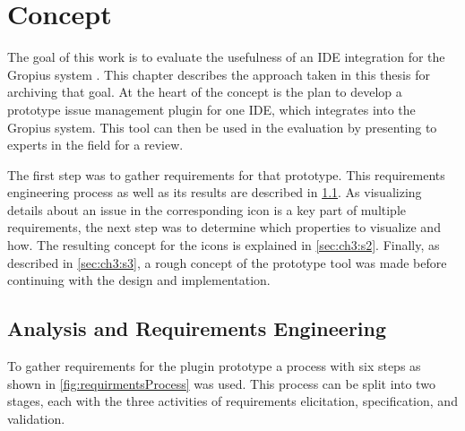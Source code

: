 
\chapter{Concept}
\label{chap:ch3}
The goal of this work is to evaluate the usefulness of an \gls{IDE} integration for the Gropius system \cite{speth2020gropius}.
This chapter describes the approach taken in this thesis for archiving that goal.
At the heart of the concept is the plan to develop a prototype issue management plugin for one \gls{IDE},
which integrates into the Gropius system.
This tool can then be used in the evaluation by presenting to experts in the field for a review.

The first step was to gather requirements for that prototype. 
This requirements engineering process as well as its results are described in \cref{sec:ch3:s1}.
As visualizing details about an issue in the corresponding icon is a key part of multiple requirements,
the next step was to determine which properties to visualize and how.
The resulting concept for the icons is explained in \cref{sec:ch3:s2}.
Finally, as described in \cref{sec:ch3:s3}, 
a rough concept of the prototype tool was made before continuing with the design and implementation.

\section{Analysis and Requirements Engineering}
\label{sec:ch3:s1}
To gather requirements for the plugin prototype a process with six steps as shown in \cref{fig:requirmentsProcess} was used.
This process can be split into two stages, each with the three activities of requirements elicitation, specification, and validation.

